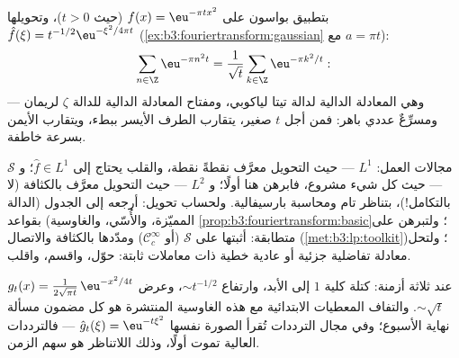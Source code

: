 \begin{example}
\label{ex:b3:fouriertransform:theta}
بتطبيق بواسون على $f(x) = \eu^{-\pi tx^2}$ (حيث $t > 0$)، وتحويلها $\hat f(\xi) = t^{-1/2}\eu^{-\xi^2/4\pi t}$
(\cref{ex:b3:fouriertransform:gaussian} مع $a = \pi t$):
\[
\sum_{n\in\Z}\eu^{-\pi n^2t}
= \frac1{\sqrt t}\sum_{k\in\Z}\eu^{-\pi k^2/t} :
\]
وهي المعادلة الدالية لدالة تيتا لياكوبي، ومفتاح المعادلة
الدالية للدالة $\zeta$ لريمان --- ومسرِّعٌ عددي باهر: فمن أجل
$t$ صغير، يتقارب الطرف الأيسر ببطء، ويتقارب الأيمن بسرعة
خاطفة.
\end{example}

\begin{method}\label{met:b3:fouriertransform:method}
مجالات العمل: $L^1$ --- حيث التحويل معرَّف نقطةً نقطة، والقلب
يحتاج إلى $\hat f \in L^1$؛ و $\mathcal S$ --- حيث كل شيء
مشروع، فابرهن هنا أولًا؛ و $L^2$ --- حيث التحويل معرَّف
بالكثافة (لا بالتكامل!)، بتناظر تام ومحاسبة بارسيفالية. ولحساب
تحويل: أرجعه إلى الجدول (الدالة المميّزة، والأُسّي، والغاوسية)
بقواعد \cref{prop:b3:fouriertransform:basic}؛ ولتبرهن على متطابقة: أثبتها على
$\mathcal S$ (أو $\mathcal C_c^\infty$) ومدّدها بالكثافة والاتصال
(\cref{met:b3:lp:toolkit})؛ ولتحل معادلة تفاضلية جزئية أو عادية خطية ذات
معاملات ثابتة: حوّل، واقسم، واقلب.
\end{method}

\begin{omfigure}

{\small {} $g_t(x) =
\frac1{2\sqrt{\pi t}}\,\eu^{-x^2/4t}$ عند ثلاثة أزمنة: كتلة كلية $1$
إلى الأبد، وارتفاع $\sim t^{-1/2}$، وعرض $\sim
\sqrt t$. والتفاف
المعطيات الابتدائية مع هذه الغاوسية المنتشرة هو كل مضمون مسألة
نهاية الأسبوع؛ وفي مجال الترددات تُقرأ الصورة نفسها
$\hat g_t(\xi) = \eu^{-t\xi^2}$ --- فالترددات العالية تموت أولًا، وذلك اللاتناظر هو سهم
الزمن.}
\end{omfigure}

